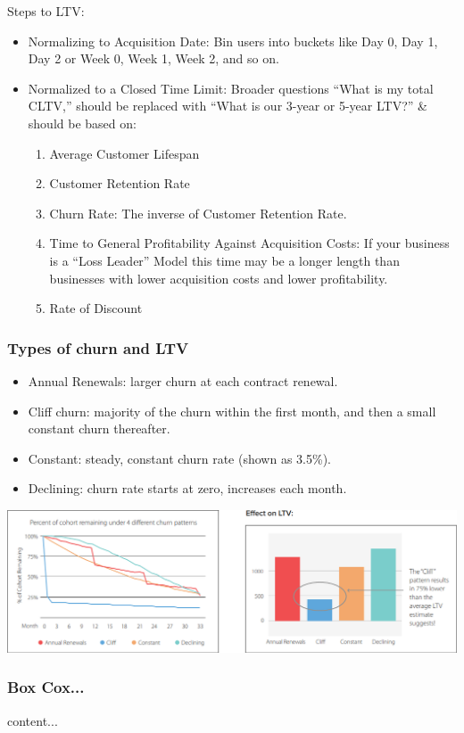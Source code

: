 \documentclass{beamer}
\begin{document}
\begin{frame}
Steps to LTV:
\begin{itemize}
\item Normalizing to Acquisition Date: Bin users into buckets like Day 0, Day 1, Day 2 or Week 0, Week 1, Week 2, and so on.
\item Normalized to a Closed Time Limit: Broader questions  “What is my total CLTV,” should be replaced with “What is our 3-year or 5-year LTV?” \& should be based on:
\begin{enumerate}
\item Average Customer Lifespan
\item Customer Retention Rate
\item Churn Rate: The inverse of Customer Retention Rate.
\item Time to General Profitability Against Acquisition Costs: If your business is a “Loss Leader” Model this time may be a longer length than businesses with lower acquisition costs and lower profitability.
\item Rate of Discount		
\end{enumerate}

\end{itemize}
\end{frame}

\begin{frame}\frametitle{Types of churn and LTV}
\begin{itemize}
\item Annual Renewals: larger churn at each contract renewal.
\item Cliff churn: majority of the churn within the first month, and then a small constant churn thereafter.
\item Constant: steady, constant churn rate (shown as 3.5\%).
\item Declining: churn rate starts at zero, increases each month.
\end{itemize}
\includegraphics[scale=0.4]{churnltv}
\end{frame}

\begin{frame}\frametitle{Box Cox... }
content...
\end{frame}
\end{document}
